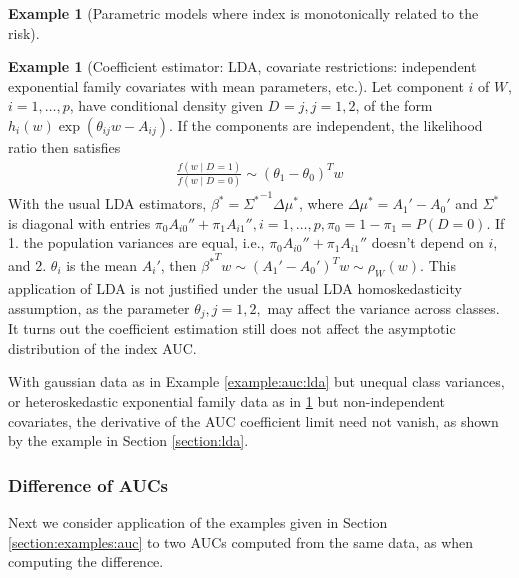 \documentclass[12pt]{article}
\renewcommand{\P}{P}
\newcommand{\W}[1][]{W_{#1}}
\newcommand{\D}[1][]{D_{#1}}
\renewcommand{\t}[1]{{#1}^T}
\renewcommand{\star}[1]{{#1}^\ast}
\newcommand{\risk}[1][]{\rho_{#1}}
\theoremstyle{definition}
\newtheorem{example}{Example}%
\newtheorem{subexample}{Example}%
\begin{document}
\begin{example}[Parametric models where index is monotonically related
  to the risk]
\begin{subexample}[Coefficient estimator: LDA, covariate restrictions:
  independent exponential family covariates with mean
  parameters, etc.]\label{example:auc:exponential} Let component $i$ of $\W$,
  $i=1,\ldots,p$, have conditional density given $\D=j,j=1,2$, of the
  form $h_i(w)\exp(\theta_{ij}w-A_{ij})$. If the components
  are independent, the likelihood ratio then satisfies
\begin{align}
   \frac{f(w\mid \D=1)}{f(w\mid \D=0)} \sim \t{(\theta_1-\theta_0)}w
\end{align}
With the usual LDA estimators, $\star\beta={\star{\Sigma}}^{-1}\Delta\star{\mu}$, where $\Delta\star{\mu}=A_1'-A_0'$ and $\star\Sigma$ is diagonal with entries $\pi_0A_{i0}''+\pi_1A_{i1}'',i=1,\ldots,p, \pi_0=1-\pi_1=\P(D=0)$. If 1. the population variances are equal, i.e., $\pi_0A_{i0}''+\pi_1A_{i1}''$ doesn't depend on $i$, and 2. $\theta_i$ is the mean $A_i'$, then $\t{\star{\beta}}w \sim \t{(A_1'-A_0')}w \sim \risk[\W](w)$.
This application of LDA is not justified under the usual LDA
homoskedasticity assumption, as the parameter $\theta_j,j=1,2,$ may
affect the variance across classes. It turns out the coefficient
estimation still does not affect the asymptotic distribution of the index AUC.
\end{subexample}
\end{example}

With gaussian data as in Example \ref{example:auc:lda} but unequal
class variances, or heteroskedastic exponential family data as in
\ref{example:auc:exponential} but non-independent covariates, the
derivative of the AUC coefficient limit need not vanish, as shown by
the example in Section \ref{section:lda}.

\subsubsection{Difference of AUCs}
Next we consider application of the examples given in Section \ref{section:examples:auc} to two AUCs computed from the same data, as when
computing the difference.
\end{document}
